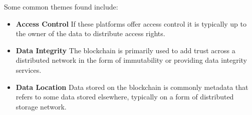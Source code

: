 \noindent
Some common themes found include:

\begin{itemize}
  \item \textbf{Access Control} If these platforms offer access control it is typically up to the owner of the data to distribute access rights. 
  \item \textbf{Data Integrity} The blockchain is primarily used to add trust across a distributed network in the form of immutability or providing data integrity services.
  \item \textbf{Data Location} Data stored on the blockchain is commonly metadata that refers to some data stored elsewhere, typically on a form of distributed storage network. 
\end{itemize}
